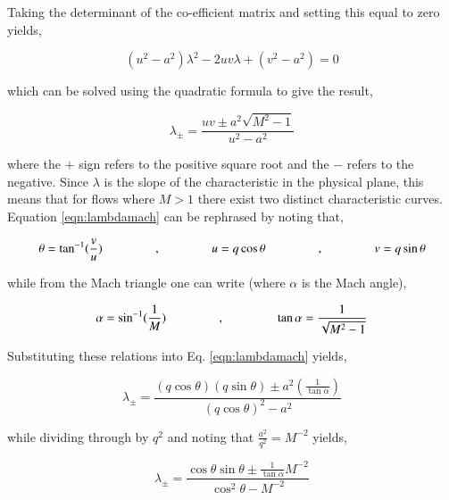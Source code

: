 	Taking the determinant of the co-efficient matrix and setting this equal to zero yields,

\begin{displaymath}
	(u^2-a^2)\lambda^2 -2uv\lambda + (v^2-a^2) = 0 
\end{displaymath}

	which can be solved using the quadratic formula to give the result,

\begin{equation}
	\lambda_\pm = \frac{uv \pm a^2\sqrt{M^2-1}}{u^2-a^2}
\label{eqn:lambdamach}
\end{equation}

	where the $+$ sign refers to the positive square root and the $-$ refers to the negative.
Since $\lambda$ is the slope of the characteristic in the physical plane, this means that for flows
where $M > 1$ there exist two distinct characteristic curves.  Equation \ref{eqn:lambdamach} can
be rephrased by noting that,

\begin{displaymath}
	\theta  = \tan^{-1}(\frac{v}{u}) \hspace{1.5cm} \textrm{,} \hspace{1.5cm} 
	u = q\cos\theta \hspace{1.5cm} \textrm{,} \hspace{1.5cm} v = q\sin\theta 
\end{displaymath}

	while from the Mach triangle one can write (where $\alpha$ is the Mach angle),

\begin{displaymath}
	\alpha = \sin^{-1}(\frac{1}{M}) \hspace{1.5cm} \textrm{,} \hspace{1.5cm}
	\tan\alpha = \frac{1}{\sqrt{M^2-1}}
\end{displaymath}

	Substituting these relations into Eq. \ref{eqn:lambdamach} yields,

\begin{displaymath}
	\lambda_\pm = \frac{(q\cos\theta) (q\sin\theta) \pm a^2(\frac{1}{\tan\alpha})}
	{(q\cos\theta)^2-a^2}
\end{displaymath}	

	while dividing through by $q^2$ and noting that $\frac{a^2}{q^2} = M^{-2}$ yields,

\begin{displaymath}
	\lambda_\pm = \frac{\cos\theta \sin\theta \pm \frac{1}{\tan\alpha}M^{-2}}
	{\cos^2\theta-M^{-2}}
\end{displaymath}	

